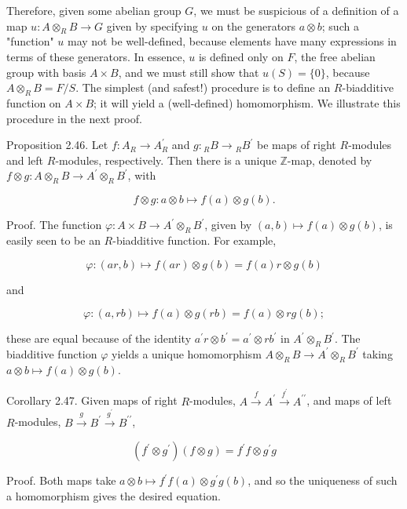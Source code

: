 \documentclass[10pt]{article}
\begin{document}
Therefore, given some abelian group $G$, we must be suspicious of a definition of a map $u: A \otimes_{R} B \rightarrow G$ given by specifying $u$ on the generators $a \otimes b$; such a "function" $u$ may not be well-defined, because elements have many expressions in terms of these generators. In essence, $u$ is defined only on $F$, the free abelian group with basis $A \times B$, and we must still show that $u(S)=\{0\}$, because $A \otimes_{R} B=F / S$. The simplest (and safest!) procedure is to define an $R$-biadditive function on $A \times B$; it will yield a (well-defined) homomorphism. We illustrate this procedure in the next proof.

Proposition 2.46. Let $f: A_{R} \rightarrow A_{R}^{\prime}$ and $g:{ }_{R} B \rightarrow{ }_{R} B^{\prime}$ be maps of right $R$-modules and left $R$-modules, respectively. Then there is a unique $\mathbb{Z}$-map, denoted by $f \otimes g: A \otimes_{R} B \rightarrow A^{\prime} \otimes_{R} B^{\prime}$, with

$$
f \otimes g: a \otimes b \mapsto f(a) \otimes g(b) .
$$

Proof. The function $\varphi: A \times B \rightarrow A^{\prime} \otimes_{R} B^{\prime}$, given by $(a, b) \mapsto f(a) \otimes g(b)$, is easily seen to be an $R$-biadditive function. For example,

$$
\varphi:(a r, b) \mapsto f(a r) \otimes g(b)=f(a) r \otimes g(b)
$$

and

$$
\varphi:(a, r b) \mapsto f(a) \otimes g(r b)=f(a) \otimes r g(b) ;
$$

these are equal because of the identity $a^{\prime} r \otimes b^{\prime}=a^{\prime} \otimes r b^{\prime}$ in $A^{\prime} \otimes_{R} B^{\prime}$. The biadditive function $\varphi$ yields a unique homomorphism $A \otimes_{R} B \rightarrow A^{\prime} \otimes_{R} B^{\prime}$ taking $a \otimes b \mapsto f(a) \otimes g(b)$.

Corollary 2.47. Given maps of right $R$-modules, $A \xrightarrow{f} A^{\prime} \xrightarrow{f^{\prime}} A^{\prime \prime}$, and maps of left $R$-modules, $B \xrightarrow{g} B^{\prime} \xrightarrow{g^{\prime}} B^{\prime \prime}$,

$$
\left(f^{\prime} \otimes g^{\prime}\right)(f \otimes g)=f^{\prime} f \otimes g^{\prime} g
$$

Proof. Both maps take $a \otimes b \mapsto f^{\prime} f(a) \otimes g^{\prime} g(b)$, and so the uniqueness of such a homomorphism gives the desired equation.
\end{document}
